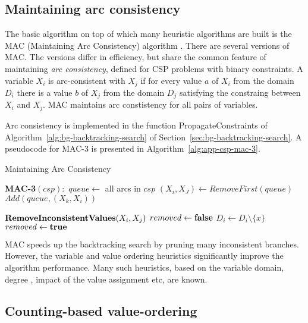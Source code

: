 \subsection{Maintaining arc consistency}

The basic algorithm on top of which many heuristic algorithms are
built is the MAC (Maintaining Arc Consistency) algorithm
\cite{Sabin.mac}. There are several versions of MAC. The versions
differ in efficiency, but share the common feature of maintaining {\em
arc consistency}, defined for CSP problems with binary constraints. A
variable $X_i$ is arc-consistent with $X_j$ if for every value $a$ of
$X_i$ from the domain $D_i$ there is a value $b$ of $X_j$ from the
domain $D_j$ satisfying the constraing between $X_i$ and $X_j$. MAC
maintains arc constistency for all pairs of variables.

Arc consistency is implemented in the function {PropagateConstraints}
of Algorithm~\ref{alg:bg-backtracking-search} of
Section~\ref{sec:bg-backtracking-search}.  A pseudocode for MAC-3
\cite{Russell.aima} is presented in Algorithm~\ref{alg:app-csp-mac-3}.
\begin{algorithm}
\caption{Maintaining Arc Consistency}
\label{alg:app-csp-mac-3}
\begin{algorithmic}[1]
\item[{\bf MAC-3}$(csp):$]
\STATE $queue \leftarrow$ all arcs in $csp$
  \STATE $(X_i, X_J) \leftarrow RemoveFirst(queue)$
      \STATE $Add(queue, (X_k, X_i))$
    \ENDFOR
  \ENDIF
\ENDWHILE
\vspace{1em}
\item[${\bf RemoveInconsistentValues}(X_i, X_j)$]
  \STATE $removed \leftarrow {\bf false}$
        \STATE $D_i \leftarrow D_i \setminus \{x\}$
        \STATE $removed \leftarrow {\bf true}$
    \ENDIF
  \ENDFOR
\end{algorithmic}
\end{algorithm}
MAC speeds up the backtracking search by pruning many inconsistent
branches. However, the variable and value ordering heuristics
significantly improve the algorithm performance. Many such heuristics,
based on the variable domain, degree \cite{Sabin.mac}, impact of the
value assignment \cite{Refalo.impact} etc, are known.

\subsection{Counting-based value-ordering}

